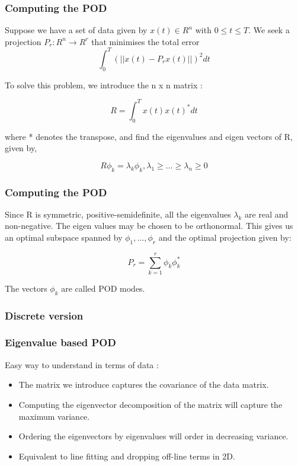\documentclass{beamer}
\begin{document}
\begin{frame}
\frametitle{Computing the POD}
Suppose we have a set of data given by $x(t) \in R^n$ with $0 \leq t \leq T $. We seek a projection
$P_r : R^n \rightarrow R^r$ that minimises the total error \\

\begin{equation}
\int_0^T (||x(t) - P_r x(t)||)^2dt 
\label{pod:1}
\end{equation}

To solve this problem, we introduce the n x n matrix : 

\begin{equation}
R = \int_0^Tx(t)x(t)^*dt
\label{pod:2}
\end{equation}

where * denotes the transpose, and find the eigenvalues and eigen vectors of R, given by,

\begin{equation}
R\phi_k = \lambda_k \phi_k, \lambda_1 \geq \dots \geq \lambda_n \geq 0
\label{pod:3}
\end{equation}

\end{frame}

\begin{frame}
\frametitle{Computing the POD}
Since R is symmetric, positive-semidefinite, all the eigenvalues $\lambda_k$ are real and 
non-negative. The eigen values may be chosen to be orthonormal. This gives us an optimal 
subspace spanned by ${\phi_1, \dots, \phi_r}$ and the optimal projection given by:

\begin{equation}
P_r = \sum_{k=1}^r \phi_k \phi^*_k
\label{pod:4}
\end{equation}

The vectors $\phi_k$ are called POD modes.
\end{frame}


\subsubsection{Discrete version}
\begin{frame}
\frametitle{Eigenvalue based POD}
Easy way to understand in terms of data : 
\begin{itemize}
\item
The matrix we introduce captures the covariance of the data matrix.
\item
Computing the eigenvector decomposition of the matrix will capture the maximum variance.
\item
Ordering the eigenvectors by eigenvalues will order in decreasing variance.
\item
Equivalent to line fitting and dropping off-line terms in 2D.
\end{itemize}
\end{frame}
\end{document}
